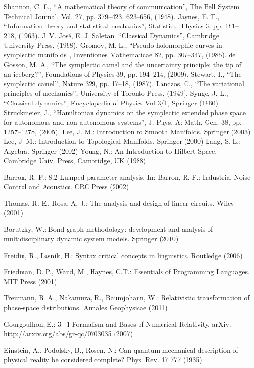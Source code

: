\documentclass[aps,pra,10pt,twocolumn,floatfix,nofootinbib]{revtex4-1}
\numberwithin{equation}{section}
\theoremstyle{definition}
\begin{document}
\begin{thebibliography}{0}

 Shannon, C. E., ``A mathematical theory of communication'', The Bell System Technical Journal, Vol. 27, pp. 379--423, 623--656, (1948).
 Jaynes, E. T., ``Information theory and statistical mechanics'', Statistical Physics 3, pp. 181--218, (1963).
 J. V. Jos\'{e}, E. J. Saletan, ``Classical Dynamics'', Cambridge University Press, (1998).
 Gromov, M. L., ``Pseudo holomorphic curves in symplectic manifolds'', Inventiones Mathematicae 82, pp. 307--347, (1985).
 de Gosson, M. A., ``The symplectic camel and the uncertainty principle: the tip of an iceberg?'', Foundations of Physics 39, pp. 194--214, (2009).
 Stewart, I., ``The symplectic camel'', Nature 329, pp. 17--18, (1987).
 Lanczos, C., ``The variational principles of mechanics'', University of Toronto Press, (1949).
 Synge, J. L., ``Classical dynamics'', Encyclopedia of Physics Vol 3/1, Springer (1960).
 Struckmeier, J., ``Hamiltonian dynamics on the symplectic extended phase space for autonomous and non-autonomous systems'', J. Phys. A: Math. Gen. 38, pp. 1257--1278, (2005).
 Lee, J. M.: Introduction to Smooth Manifolds. Springer (2003)
 Lee, J. M.: Introduction to Topological Manifolds. Springer (2000)
 Lang, S. L.: Algebra. Springer (2002)
 Young, N.: An Introduction to Hilbert Space. Cambridge Univ. Press, Cambridge, UK (1988)

 Barron, R. F.: 8.2 Lumped-parameter analysis. In: Barron, R. F.: Industrial Noise Control and Acoustics. CRC Press (2002)

 Thomas, R. E., Rosa, A. J.: The analysis and design of linear circuits. Wiley (2001) 

 Borutzky, W.: Bond graph methodology: development and analysis of multidisciplinary dynamic system models.
Springer (2010) 

 Freidin, R., Lasnik, H.: Syntax critical concepts in linguistics. Routledge (2006) 

 Friedman, D. P., Wand, M., Haynes, C.T.: Essentials of Programming Languages. MIT Press (2001)

 Treumann, R. A., Nakamura, R., Baumjohann,  W.: Relativistic transformation of phase-space distributions. Annales Geophysicae (2011)

 Gourgoulhon, E.: 3+1 Formalism and Bases of Numerical Relativity. arXiv. http://arxiv.org/abs/gr-qc/0703035 (2007)

 Einstein, A., Podolsky, B.,  Rosen, N.: Can quantum-mechanical description of physical reality be considered complete? Phys. Rev. 47 777 (1935)

\end{thebibliography}
\end{document}
